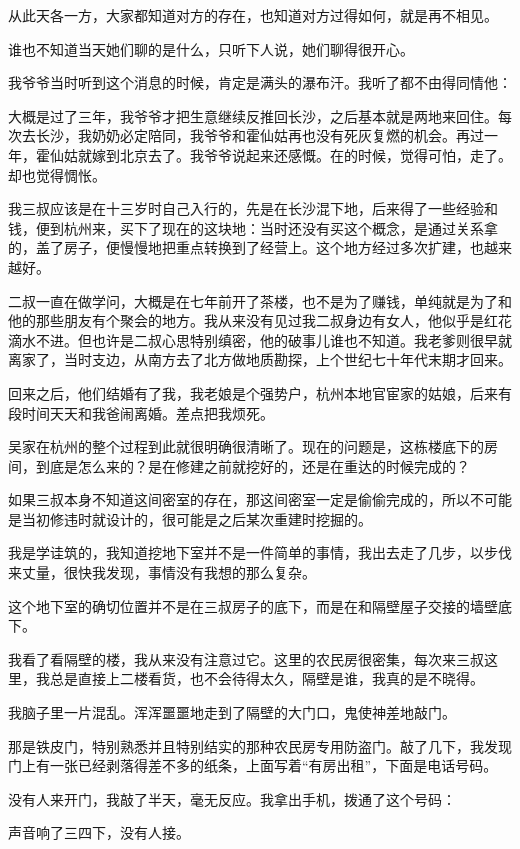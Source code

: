 从此天各一方，大家都知道对方的存在，也知道对方过得如何，就是再不相见。

谁也不知道当天她们聊的是什么，只听下人说，她们聊得很开心。

我爷爷当时听到这个消息的时候，肯定是满头的瀑布汗。我听了都不由得同情他：

大概是过了三年，我爷爷才把生意继续反推回长沙，之后基本就是两地来回住。每次去长沙，我奶奶必定陪同，我爷爷和霍仙姑再也没有死灰复燃的机会。再过一年，霍仙姑就嫁到北京去了。我爷爷说起来还感慨。在的时候，觉得可怕，走了。却也觉得惆怅。

我三叔应该是在十三岁时自己入行的，先是在长沙混下地，后来得了一些经验和钱，便到杭州来，买下了现在的这块地：当时还没有买这个概念，是通过关系拿的，盖了房子，便慢慢地把重点转换到了经营上。这个地方经过多次扩建，也越来越好。

二叔一直在做学问，大概是在七年前开了茶楼，也不是为了赚钱，单纯就是为了和他的那些朋友有个聚会的地方。我从来没有见过我二叔身边有女人，他似乎是红花滴水不进。但也许是二叔心思特别缜密，他的破事儿谁也不知道。我老爹则很早就离家了，当时支边，从南方去了北方做地质勘探，上个世纪七十年代末期才回来。

回来之后，他们结婚有了我，我老娘是个强势户，杭州本地官宦家的姑娘，后来有段时间天天和我爸闹离婚。差点把我烦死。

吴家在杭州的整个过程到此就很明确很清晰了。现在的问题是，这栋楼底下的房间，到底是怎么来的？是在修建之前就挖好的，还是在重达的时候完成的？

如果三叔本身不知道这间密室的存在，那这间密室一定是偷偷完成的，所以不可能是当初修违时就设计的，很可能是之后某次重建时挖掘的。

我是学诖筑的，我知道挖地下室并不是一件简单的事情，我出去走了几步，以步伐来丈量，很快我发现，事情没有我想的那么复杂。

这个地下室的确切位置并不是在三叔房子的底下，而是在和隔壁屋子交接的墙壁底下。

我看了看隔壁的楼，我从来没有注意过它。这里的农民房很密集，每次来三叔这里，我总是直接上二楼看货，也不会待得太久，隔壁是谁，我真的是不晓得。

我脑子里一片混乱。浑浑噩噩地走到了隔壁的大门口，鬼使神差地敲门。

那是铁皮门，特别熟悉并且特别结实的那种农民房专用防盗门。敲了几下，我发现门上有一张已经剥落得差不多的纸条，上面写着“有房出租”，下面是电话号码。

没有人来开门，我敲了半天，毫无反应。我拿出手机，拨通了这个号码：

声音响了三四下，没有人接。

